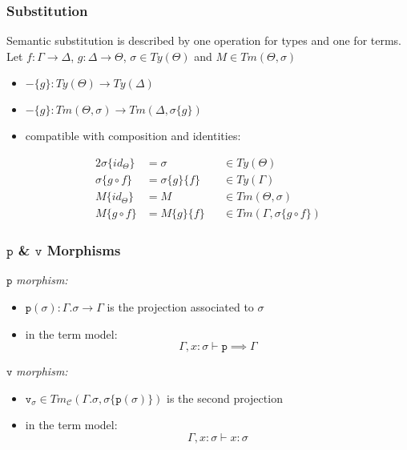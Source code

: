 \documentclass[aspectratio=169]{beamer}
\newcommand{\cate}{\mathcal{C}}
\newcommand{\terms}{Tm_{\cate}}
\newcommand{\pp}{\texttt{p}}
\newcommand{\vv}{\texttt{v}}
\newcommand{\extension}{\Gamma.\sigma}
\begin{document}
     \begin{frame}
        \frametitle{Substitution}
        \vspace{10pt}
        Semantic substitution is described by one operation for types and one for terms.\\
        \vspace{8pt}
        Let $f: \Gamma\to\Delta$, $g: \Delta\to\Theta$, $\sigma\in Ty(\Theta)$ and $M\in Tm(\Theta,\sigma)$
        \begin{itemize}
            \item $-\{g\}: Ty(\Theta)\to Ty(\Delta)$
            \item $-\{g\}:Tm(\Theta,\sigma)\to Tm(\Delta,\sigma\{g\})$
            \item compatible with composition and identities:
        \end{itemize}
        \begin{alignat*}{2}
            \sigma\{id_\Theta\} &= \sigma &&\in Ty(\Theta)\\
            \sigma\{g\circ f\} &= \sigma\{g\}\{f\} &&\in Ty(\Gamma)\\
            M\{id_\Theta\} &= M &&\in Tm(\Theta,\sigma)\\
            M\{g\circ f\} &= M\{g\}\{f\} &&\in Tm(\Gamma,\sigma\{g\circ f\})
        \end{alignat*}
    \end{frame}

    \begin{frame}
        \frametitle{$\pp$ \& $\vv$ Morphisms}
        $\pp$ \emph{morphism:}
        \begin{itemize}
            \item $\pp(\sigma):\extension\to\Gamma$ is the projection associated to $\sigma$
            \item in the term model:
            $$\Gamma,x:\sigma\vdash\pp\implies\Gamma$$
        \end{itemize}
        \vspace{8pt}
        $\vv$ \emph{morphism:}
        \begin{itemize}
            \item $\vv_\sigma \in \terms(\extension,\sigma\{\pp(\sigma)\})$ is the second projection
            \item in the term model:
            $$\Gamma,x:\sigma\vdash x:\sigma$$
        \end{itemize}
    \end{frame}
\end{document}

